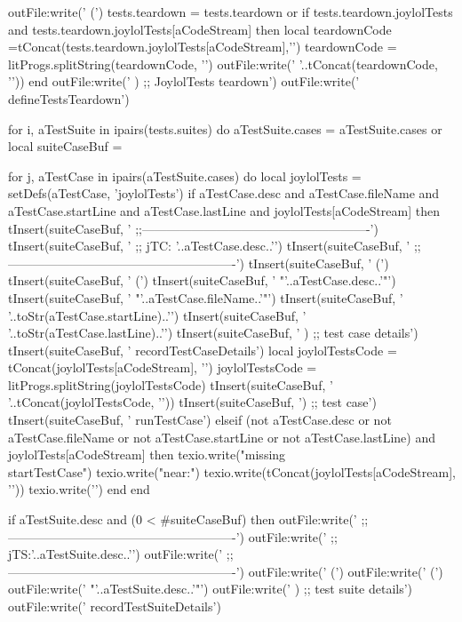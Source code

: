   outFile:write('  (\n')
  tests.teardown = tests.teardown or { }
  if tests.teardown.joylolTests and
    tests.teardown.joylolTests[aCodeStream] then
    local teardownCode =tConcat(tests.teardown.joylolTests[aCodeStream],'\n  ')
    teardownCode = litProgs.splitString(teardownCode, '\n')
    outFile:write('  '..tConcat(teardownCode, '\n  '))
  end
  outFile:write('  ) ;; JoylolTests teardown\n')
  outFile:write('  defineTestsTeardown\n\n')

  for i, aTestSuite in ipairs(tests.suites) do
    aTestSuite.cases = aTestSuite.cases or { }
    local suiteCaseBuf = { }

    for j, aTestCase in ipairs(aTestSuite.cases) do
      local joylolTests     = setDefs(aTestCase, 'joylolTests')
      if aTestCase.desc and
        aTestCase.fileName and
        aTestCase.startLine and
        aTestCase.lastLine and
        joylolTests[aCodeStream] then
        tInsert(suiteCaseBuf, '    ;;-------------------------------------------------------\n')
        tInsert(suiteCaseBuf, '    ;; jTC: '..aTestCase.desc..'\n')
        tInsert(suiteCaseBuf, '    ;;-------------------------------------------------------\n')
        tInsert(suiteCaseBuf, '    (\n')
        tInsert(suiteCaseBuf, '      (\n')
        tInsert(suiteCaseBuf, '        "'..aTestCase.desc..'"\n')
        tInsert(suiteCaseBuf, '        "'..aTestCase.fileName..'"\n')
        tInsert(suiteCaseBuf, '        '..toStr(aTestCase.startLine)..'\n')
        tInsert(suiteCaseBuf, '        '..toStr(aTestCase.lastLine)..'\n')
        tInsert(suiteCaseBuf, '      ) ;; test case details\n')
        tInsert(suiteCaseBuf, '      recordTestCaseDetails\n\n')
        local joylolTestsCode = tConcat(joylolTests[aCodeStream], '\n')
        joylolTestsCode       = litProgs.splitString(joylolTestsCode)
        tInsert(suiteCaseBuf, '    '..tConcat(joylolTestsCode, '\n    '))
        tInsert(suiteCaseBuf, '\n    ) ;; test case\n')
        tInsert(suiteCaseBuf, '    runTestCase\n\n')
      elseif (not aTestCase.desc or
        not aTestCase.fileName or
        not aTestCase.startLine or
        not aTestCase.lastLine) and
        joylolTests[aCodeStream] then
        texio.write("\nERROR missing \\startTestCase\n")
        texio.write("near:\n")
        texio.write(tConcat(joylolTests[aCodeStream], '\n'))
        texio.write('\n')
      end
    end

    if aTestSuite.desc and (0 < #suiteCaseBuf) then
      outFile:write('  ;;-------------------------------------------------------\n')
      outFile:write('  ;; jTS:'..aTestSuite.desc..'\n')
      outFile:write('  ;;-------------------------------------------------------\n')
      outFile:write('  (\n')
      outFile:write('    (\n')
      outFile:write('      "'..aTestSuite.desc..'"\n')
      outFile:write('    ) ;; test suite details\n')
      outFile:write('    recordTestSuiteDetails\n\n')

